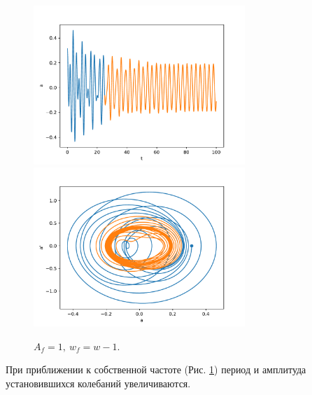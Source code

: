             \begin{figure}[H]
                \centering
                \includegraphics[width=8cm]{pictures/5resonance2.pdf}
                \includegraphics[width=8cm]{pictures/5resonance2p.pdf}
                \caption{$A_f = 1, ~ w_f = w-1$.}\label{kww1}
            \end{figure}
            При приближении к собственной частоте (Рис. \ref{kww1}) период и амплитуда установившихся колебаний увеличиваются.

